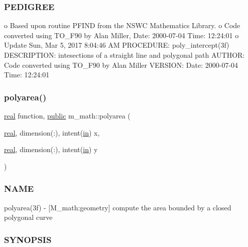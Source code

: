 \subsubsection*{P\+E\+D\+I\+G\+R\+EE}

o Based upon routine P\+F\+I\+ND from the N\+S\+WC Mathematics Library. o Code converted using T\+O\+\_\+\+F90 by Alan Miller, Date\+: 2000-\/07-\/04 Time\+: 12\+:24\+:01 o Update Sun, Mar 5, 2017 8\+:04\+:46 AM P\+R\+O\+C\+E\+D\+U\+RE\+: poly\+\_\+intercept(3f) D\+E\+S\+C\+R\+I\+P\+T\+I\+ON\+: intesections of a straight line and polygonal path A\+U\+T\+H\+OR\+: Code converted using T\+O\+\_\+\+F90 by Alan Miller V\+E\+R\+S\+I\+ON\+: Date\+: 2000-\/07-\/04 Time\+: 12\+:24\+:01 \mbox{\label{namespacem__math_a2324f10703d77ef5fde6f502ac3e65f6}} 
\subsubsection{\texorpdfstring{polyarea()}{polyarea()}}
{\footnotesize\ttfamily \hyperlink{read__watch_83_8txt_abdb62bde002f38ef75f810d3a905a823}{real} function, \hyperlink{M__stopwatch_83_8txt_a2f74811300c361e53b430611a7d1769f}{public} m\+\_\+math\+::polyarea (\begin{DoxyParamCaption}\item[{\hyperlink{read__watch_83_8txt_abdb62bde002f38ef75f810d3a905a823}{real}, dimension(\+:), intent(\hyperlink{M__journal_83_8txt_afce72651d1eed785a2132bee863b2f38}{in})}]{x,  }\item[{\hyperlink{read__watch_83_8txt_abdb62bde002f38ef75f810d3a905a823}{real}, dimension(\+:), intent(\hyperlink{M__journal_83_8txt_afce72651d1eed785a2132bee863b2f38}{in})}]{y }\end{DoxyParamCaption})}



\subsubsection*{N\+A\+ME}

polyarea(3f) -\/ \mbox{[}M\+\_\+math\+:geometry\mbox{]} compute the area bounded by a closed polygonal curve 

\subsubsection*{S\+Y\+N\+O\+P\+S\+IS}

